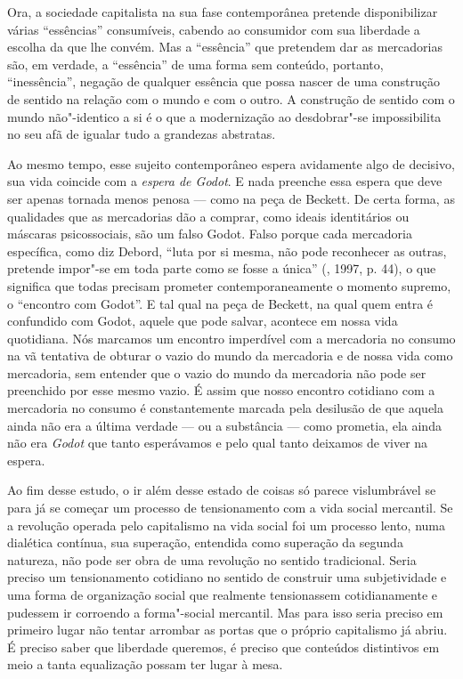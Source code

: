 Ora, a sociedade capitalista na sua fase contemporânea pretende
disponibilizar várias ``essências'' consumíveis, cabendo ao consumidor
com sua liberdade a escolha da que lhe convém. Mas a ``essência'' que
pretendem dar as mercadorias são, em verdade, a ``essência'' de uma
forma sem conteúdo, portanto, ``inessência'', negação de qualquer
essência que possa nascer de uma construção de sentido na relação com o
mundo e com o outro. A construção de sentido com o mundo não"-identico a
si é o que a modernização ao desdobrar"-se impossibilita no seu afã de
igualar tudo a grandezas abstratas.

Ao mesmo tempo, esse sujeito contemporâneo espera avidamente algo de
decisivo, sua vida coincide com a \emph{espera de Godot}. E nada
preenche essa espera que deve ser apenas tornada menos penosa --- como
na peça de Beckett. De certa forma, as qualidades que as mercadorias dão
a comprar, como ideais identitários ou máscaras psicossociais, são um
falso Godot. Falso porque cada mercadoria específica, como diz Debord,
``luta por si mesma, não pode reconhecer as outras, pretende impor"-se em
toda parte como se fosse a única'' (, 1997, p. 44), o que
significa que todas precisam prometer contemporaneamente o momento
supremo, o ``encontro com Godot''. E tal qual na peça de Beckett, na
qual quem entra é confundido com Godot, aquele que pode salvar, acontece
em nossa vida quotidiana. Nós marcamos um encontro imperdível com a
mercadoria no consumo na vã tentativa de obturar o vazio do mundo da
mercadoria e de nossa vida como mercadoria, sem entender que o vazio do
mundo da mercadoria não pode ser preenchido por esse mesmo vazio. É
assim que nosso encontro cotidiano com a mercadoria no consumo é
constantemente marcada pela desilusão de que aquela ainda não era a
última verdade --- ou a substância --- como prometia, ela ainda não era
\emph{Godot} que tanto esperávamos e pelo qual tanto deixamos de viver
na espera.

Ao fim desse estudo, o ir além desse estado de coisas só parece
vislumbrável se para já se começar um processo de tensionamento com a
vida social mercantil. Se a revolução operada pelo capitalismo na vida
social foi um processo lento, numa dialética contínua, sua superação,
entendida como superação da segunda natureza, não pode ser obra de uma
revolução no sentido tradicional. Seria preciso um tensionamento
cotidiano no sentido de construir uma subjetividade e uma forma de
organização social que realmente tensionassem cotidianamente e pudessem
ir corroendo a forma"-social mercantil. Mas para isso seria preciso em
primeiro lugar não tentar arrombar as portas que o próprio capitalismo
já abriu. É preciso saber que liberdade queremos, é preciso que
conteúdos distintivos em meio a tanta equalização possam ter lugar à
mesa.

